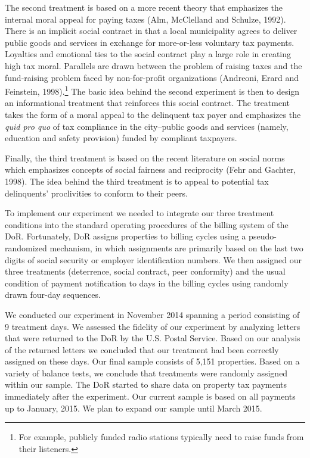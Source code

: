 \documentclass[12pt,titlepage]{article}
\begin{document}
The second treatment is based on a more recent theory that emphasizes
the internal moral appeal for paying taxes (Alm, McClelland and Schulze, 1992). 
There is an implicit social contract in that a local municipality agrees to deliver
public goods and services in exchange for more-or-less voluntary tax
payments.  Loyalties and emotional ties to the social contract play a large role in creating
high tax moral. Parallels are drawn between the problem of raising
taxes and the fund-raising problem faced by non-for-profit
organizations (Andreoni, Erard and Feinstein, 1998).\footnote{For example, publicly funded radio stations
  typically need to raise funds from their listeners.} The basic idea
behind the second experiment is then to design an informational
treatment that reinforces this social contract. The treatment takes
the form of a moral appeal to the delinquent tax payer and emphasizes
the \textit{quid pro quo} of tax compliance in the city--public goods
and services (namely, education and safety provision) funded by
compliant taxpayers. 

Finally, the third treatment is based on the recent literature on
social norms which emphasizes concepts of social fairness and
reciprocity (Fehr and Gachter, 1998). The idea behind the third treatment is to appeal to
potential tax delinquents' proclivities to conform to their peers.

To implement our experiment we needed to integrate our three treatment conditions into
the standard operating procedures of the billing system of
the DoR. Fortunately, DoR assigns properties to billing cycles
using a pseudo-randomized mechanism, in which assignments are primarily
based on the last two digits of social security or  employer
identification numbers.  We then assigned our three treatments (deterrence,
social contract, peer conformity) and the usual condition
of payment notification to days in the billing cycles using randomly drawn four-day sequences.

We conducted our experiment in November 2014 spanning a period 
consisting of 9 treatment days.  We assessed the fidelity of our
experiment by analyzing letters that were returned to the DoR by the
U.S. Postal Service. Based on our analysis of the returned letters we
concluded that our treatment had been correctly assigned on these
days. Our final sample consists of 5,151
properties. Based on a variety of balance tests, we conclude
that treatments were randomly assigned within our sample. The DoR
started to share data on property tax payments immediately after the
experiment. Our current sample is based on all payments up to January,
2015. We plan to expand our sample until March 2015.
\end{document}

